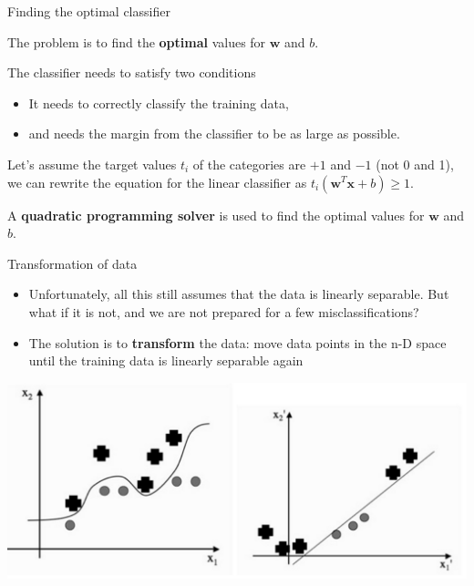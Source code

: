 \documentclass[compress]{beamer}
\begin{document}
\begin{frame}{Finding the optimal classifier}

The problem is to find the \textbf{optimal} values for $\mathbf{w}$ and
$b$.

The classifier needs to satisfy two conditions

\begin{itemize}

\item It needs to correctly classify the training data,
\item and needs the margin from the classifier to be as large as possible.
\end{itemize}

\pause

Let's assume the target values $t_i$ of the categories are $+1$ and $-1$
(not 0 and 1), we can rewrite the equation for the linear classifier
as $t_i ( \mathbf{w}^T\mathbf{x} + b) \geq 1$.

A \textbf{quadratic programming solver} is used to find the optimal
values for $\mathbf{w}$ and $b$.

\end{frame}

\begin{frame}{Transformation of data}

\begin{itemize}

\item Unfortunately, all this still assumes that the data is linearly
  separable. But what if it is not, and we are not prepared for a few
  misclassifications?
\item The solution is to \textbf{transform} the data: move data points in
  the n-D space until the training data is linearly separable again
\end{itemize}

    \begin{center}
        \includegraphics[width=0.8\linewidth]{svm-kernels}
    \end{center}
\end{frame}
\end{document}
